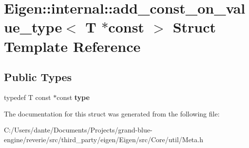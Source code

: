 \hypertarget{struct_eigen_1_1internal_1_1add__const__on__value__type_3_01_t_01_5const_01_4}{}\section{Eigen\+::internal\+::add\+\_\+const\+\_\+on\+\_\+value\+\_\+type$<$ T $\ast$const $>$ Struct Template Reference}
\label{struct_eigen_1_1internal_1_1add__const__on__value__type_3_01_t_01_5const_01_4}
\subsection*{Public Types}
\begin{DoxyCompactItemize}
\item 
\mbox{\label{struct_eigen_1_1internal_1_1add__const__on__value__type_3_01_t_01_5const_01_4_a5fa74c87aea5f9289253bf2936b836f3}} 
typedef T const  $\ast$const {\bfseries type}
\end{DoxyCompactItemize}


The documentation for this struct was generated from the following file\+:\begin{DoxyCompactItemize}
\item 
C\+:/\+Users/dante/\+Documents/\+Projects/grand-\/blue-\/engine/reverie/src/third\+\_\+party/eigen/\+Eigen/src/\+Core/util/Meta.\+h\end{DoxyCompactItemize}
